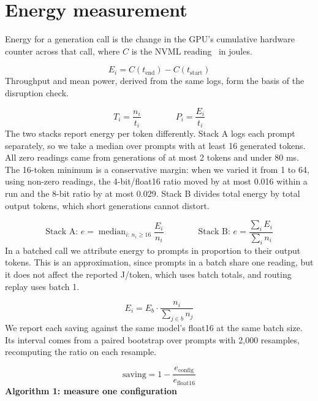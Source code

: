 \section{Energy measurement}
Energy for a generation call is the change in the GPU's cumulative hardware counter across that call, where $C$ is the NVML reading~\cite{b43} in joules.

\begin{equation}
E_i = C(t_{\mathrm{end}}) - C(t_{\mathrm{start}})
\end{equation}
Throughput and mean power, derived from the same logs, form the basis of the disruption check.

\begin{equation}
T_i = \frac{n_i}{t_i} \qquad\qquad P_i = \frac{E_i}{t_i}
\end{equation}
The two stacks report energy per token differently. Stack A logs each prompt separately, so we take a median over prompts with at least 16 generated tokens. All zero readings came from generations of at most 2 tokens and under 80 ms. The 16-token minimum is a conservative margin: when we varied it from 1 to 64, using non-zero readings, the 4-bit/float16 ratio moved by at most 0.016 within a run and the 8-bit ratio by at most 0.029. Stack B divides total energy by total output tokens, which short generations cannot distort.

\begin{equation}
\text{Stack A: } e = \operatorname{median}_{i:\, n_i \geq 16} \frac{E_i}{n_i}\qquad\qquad \text{Stack B: } e = \frac{\sum_i E_i}{\sum_i n_i}
\end{equation}
In a batched call we attribute energy to prompts in proportion to their output tokens. This is an approximation, since prompts in a batch share one reading, but it does not affect the reported J/token, which uses batch totals, and routing replay uses batch 1.

\begin{equation}
E_i = E_b \cdot \frac{n_i}{\sum_{j \in b} n_j}
\end{equation}
We report each saving against the same model's float16 at the same batch size. Its interval comes from a paired bootstrap over prompts with 2,000 resamples, recomputing the ratio on each resample.

\begin{equation}
\text{saving} = 1 - \frac{e_{\mathrm{config}}}{e_{\mathrm{float16}}}
\end{equation}
\textbf{Algorithm 1: measure one configuration}

